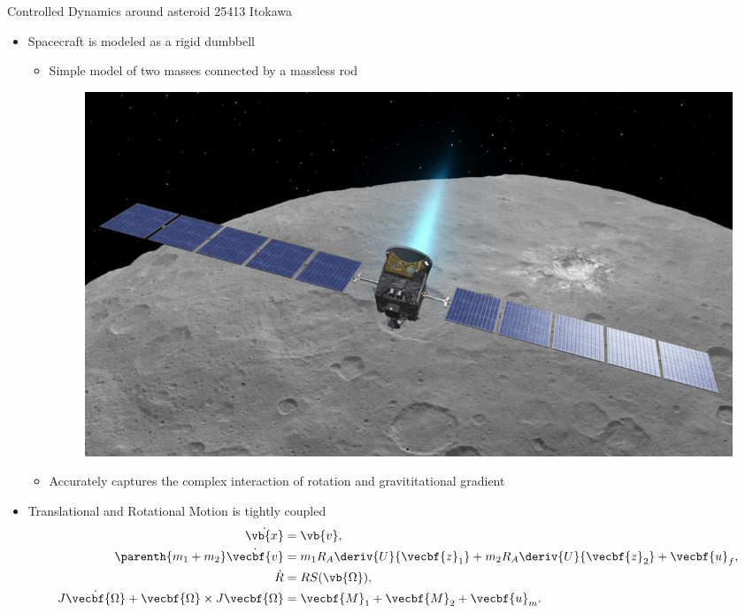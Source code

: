 \documentclass[final, usenames, dvipsnames]{beamer}
\newlength{\twocolwidth}
\begin{document}
\begin{frame}[t]
\begin{columns}[T,onlytextwidth]
\begin{column}{\twocolwidth}
\begin{block}{Controlled Dynamics around asteroid 25413 Itokawa} %
	\begin{minipage}{0.5\columnwidth} %
	\begin{itemize}
            \item Spacecraft is modeled as a rigid dumbbell
                \begin{itemize}
                    \item Simple model of two masses connected by a massless rod 
                        \begin{figure}
                            \centering
                            \includegraphics[width=0.6\columnwidth]{figures/dawn.jpg}
                        \end{figure}
                    \item Accurately captures the complex interaction of rotation and gravititational gradient
                \end{itemize}
            \item Translational and Rotational Motion is tightly coupled
                \begin{align*}
                    \dot{\vb{x}} &= \vb{v}, \\
                    \parenth{m_1 + m_2} \dot{\vecbf{v}} &= m_1 R_A \deriv{U}{\vecbf{z}_1} + m_2 R_A \deriv{U}{\vecbf{z}_2} + \vecbf{u}_f, \\
                    \dot{R} &= R S(\vb{\Omega}) , \\
                    J \dot{\vecbf{\Omega}} + \vecbf{\Omega} \times J \vecbf{\Omega} &= \vecbf{M}_1 + \vecbf{M}_2 + \vecbf{u}_m. 
                \end{align*}


\end{itemize}
\end{minipage}
\end{block}
\end{column}
\end{columns}
\end{frame}
\end{document}
